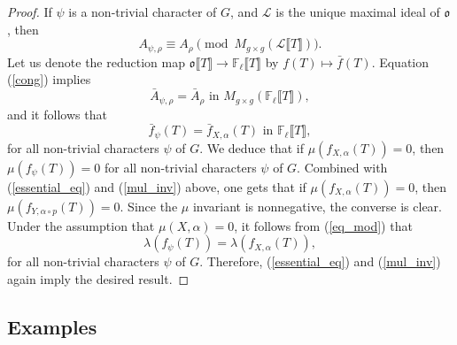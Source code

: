 \documentclass[11pt]{amsart}
\numberwithin{equation}{section}
\theoremstyle{remark}
\begin{document}
\begin{proof}
If $\psi$ is a non-trivial character of $G$, and $\mathcal{L}$ is the unique maximal ideal of $\mathfrak{o}$, then 
\begin{equation} \label{cong}
A_{\psi,\rho} \equiv A_{\rho} \pmod{M_{g \times g}(\mathcal{L}\llbracket T \rrbracket)}. 
\end{equation}
Let us denote the reduction map $\mathfrak{o}\llbracket T \rrbracket \longrightarrow \mathbb{F}_{\ell}\llbracket T \rrbracket$ by $f(T) \mapsto \bar{f}(T)$.  Equation (\ref{cong}) implies
$$\bar{A}_{\psi,\rho} = \bar{A}_{\rho} \text{ in } M_{g \times g}(\mathbb{F}_{\ell}\llbracket T \rrbracket), $$
and it follows that
\begin{equation} \label{eq_mod}
\bar{f}_{\psi}(T) = \bar{f}_{X,\alpha}(T) \text{ in } \mathbb{F}_{\ell}\llbracket T \rrbracket, 
\end{equation}
for all non-trivial characters $\psi$ of $G$.  We deduce that if $\mu(f_{X,\alpha}(T)) = 0$, then $\mu(f_{\psi}(T)) = 0$ for all non-trivial characters $\psi$ of $G$.  Combined with (\ref{essential_eq}) and (\ref{mul_inv}) above, one gets that if $\mu(f_{X,\alpha}(T)) = 0$, then $\mu(f_{Y,\alpha \circ p}(T)) = 0$.  Since the $\mu$ invariant is nonnegative, the converse is clear.  Under the assumption that $\mu(X,\alpha) = 0$, it follows from (\ref{eq_mod}) that
$$\lambda(f_{\psi}(T)) = \lambda(f_{X,\alpha}(T)), $$
for all non-trivial characters $\psi$ of $G$.  Therefore, (\ref{essential_eq}) and (\ref{mul_inv}) again imply the desired result.

\end{proof}

\subsection{Examples} \label{examples}
\end{document}
